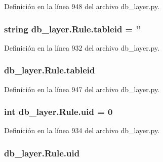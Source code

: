 Definición en la línea 948 del archivo db\-\_\-layer.\-py.

\hypertarget{classdb__layer_1_1_rule_a95e5ea7102732d56c61b4a0b3f37619b}{
\subsubsection[{tableid}]{\setlength{\rightskip}{0pt plus 5cm}string db\-\_\-layer.\-Rule.\-tableid = ''\hspace{0.3cm}{\ttfamily [static]}}}\label{classdb__layer_1_1_rule_a95e5ea7102732d56c61b4a0b3f37619b}


Definición en la línea 932 del archivo db\-\_\-layer.\-py.

\hypertarget{classdb__layer_1_1_rule_a27231c3bdb91a5ca5182fd3d82b450f2}{
\subsubsection[{tableid}]{\setlength{\rightskip}{0pt plus 5cm}db\-\_\-layer.\-Rule.\-tableid}}\label{classdb__layer_1_1_rule_a27231c3bdb91a5ca5182fd3d82b450f2}


Definición en la línea 947 del archivo db\-\_\-layer.\-py.

\hypertarget{classdb__layer_1_1_rule_acd0964c11f2797d211f109a379bfd595}{
\subsubsection[{uid}]{\setlength{\rightskip}{0pt plus 5cm}int db\-\_\-layer.\-Rule.\-uid = 0\hspace{0.3cm}{\ttfamily [static]}}}\label{classdb__layer_1_1_rule_acd0964c11f2797d211f109a379bfd595}


Definición en la línea 934 del archivo db\-\_\-layer.\-py.

\hypertarget{classdb__layer_1_1_rule_a99584e0f74f7c52fb08bd7df132672ad}{
\subsubsection[{uid}]{\setlength{\rightskip}{0pt plus 5cm}db\-\_\-layer.\-Rule.\-uid}}\label{classdb__layer_1_1_rule_a99584e0f74f7c52fb08bd7df132672ad}


